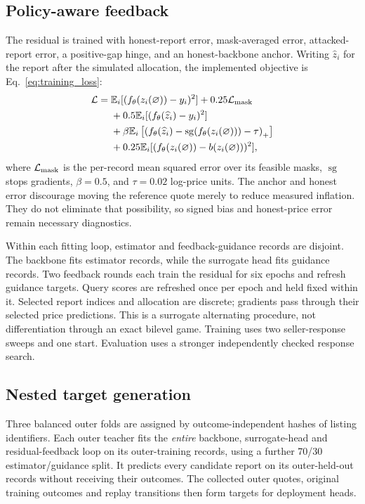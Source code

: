 \documentclass[10pt,journal]{IEEEtran}
\begin{document}
\subsection{Policy-aware feedback}
The residual is trained with honest-report error, mask-averaged error,
attacked-report error, a positive-gap hinge, and an honest-backbone anchor.
Writing $\widehat z_i$ for the report after the simulated allocation,
the implemented objective is Eq.~\eqref{eq:training_loss}:
\begin{align}
\mathcal L={}&\mathbb E_i[(f_\theta(z_i(\varnothing))-y_i)^2]
+0.25\mathcal L_{\rm mask}\nonumber\\
&+0.5\mathbb E_i[(f_\theta(\widehat z_i)-y_i)^2]\nonumber\\
&+\beta\mathbb E_i\left[\left(
f_\theta(\widehat z_i)-\operatorname{sg}(f_\theta(z_i(\varnothing)))
-\tau\right)_+\right]\nonumber\\
&+0.25\mathbb E_i[(f_\theta(z_i(\varnothing))-b(z_i(\varnothing)))^2],
\label{eq:training_loss}
\end{align}
where $\mathcal L_{\rm mask}$ is the per-record mean squared error over its
feasible masks, $\operatorname{sg}$ stops gradients, $\beta=0.5$, and
$\tau=0.02$ log-price units. The anchor and honest error discourage moving the
reference quote merely to reduce measured inflation. They do not eliminate
that possibility, so signed bias and honest-price error remain necessary
diagnostics.

Within each fitting loop, estimator and feedback-guidance records are
disjoint. The backbone fits estimator records, while the surrogate head fits
guidance records. Two feedback rounds each train the residual for six epochs
and refresh guidance targets. Query scores are refreshed once per epoch and
held fixed within it. Selected report indices and allocation are discrete;
gradients pass through their selected price predictions. This is a surrogate
alternating procedure, not differentiation through an exact bilevel game.
Training uses two seller-response sweeps and one start. Evaluation uses a
stronger independently checked response search.

\subsection{Nested target generation}
Three balanced outer folds are assigned by outcome-independent hashes of
listing identifiers. Each outer teacher fits the \emph{entire} backbone,
surrogate-head and residual-feedback loop on its outer-training records,
using a further 70/30 estimator/guidance split. It predicts every candidate
report on its outer-held-out records without receiving their outcomes.
The collected outer quotes, original training outcomes and replay transitions
then form targets for deployment heads.
\end{document}
